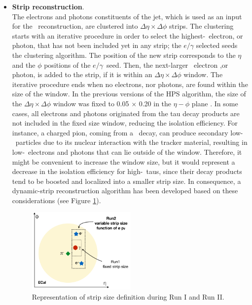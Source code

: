 \begin{itemize}
 \item \textbf{Strip reconstruction}. \\

The electrons and photons constituents of the jet, which is used as an input 
for the \tauh~reconstruction, are clustered into $\Delta\eta \times \Delta\phi$ 
strips. The clustering starts with an iterative procedure in order to select 
the highest-\pt~electron, or photon, that has not been included yet in any 
strip; the $e/\gamma$ selected seeds the clustering algorithm. The position of 
the new strip corresponds to the $\eta$ and the $\phi$ positions of the 
$e/\gamma$~seed. Then, the next-larger \pt~electron ,or photon, is 
added to the strip, if it is within an $\Delta\eta \times \Delta\phi$ window. 
The iterative procedure ends when no electrons, nor photons, are found
within the size of the window. In the previous versions of the HPS algorithm,
the size of the $\Delta\eta \times \Delta\phi$ window was fixed to 0.05 $\times$ 0.20 in the $\eta-\phi$ 
plane \cite{TauReconstructionCMSRun1}. In some cases, all 
electrons and photons originated from the tau decay products are not 
included in the fixed size window, reducing the isolation efficiency. For instance,
a charged pion, coming from a \tauh~decay, can produce secondary 
low-\pt~particles due to its nuclear interaction with the tracker 
material, resulting in low-\pt~electrons and photons 
that can lie outside of the window. Therefore, it 
might be convenient to increase the window size, but it would represent a 
decrease in the isolation efficiency for high-\pt~taus, since 
their decay products tend to be boosted and localized into a smaller strip size. In 
consequence, a dynamic-strip reconstruction algorithm has been 
developed based on these considerations (see Figure \ref{fig:StripReco}). \\

\begin{figure}[ht]
  \begin{center}
    \includegraphics[width=0.5\textwidth]{figuras/Chapter3/StripReco.png}
    \caption{Representation of strip size definition during Run I and Run II.}
    \label{fig:StripReco}
  \end{center}
\end{figure} 


\end{itemize}
